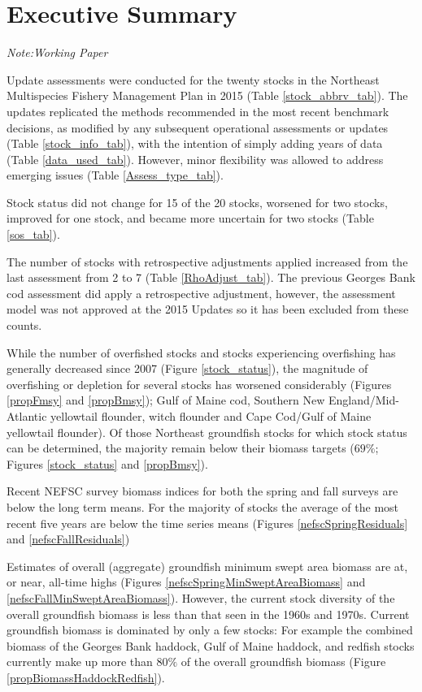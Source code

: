 
\section{Executive Summary}
\textit{Note:Working Paper}


Update assessments were conducted for the twenty stocks in the Northeast Multispecies Fishery Management Plan in 2015 (Table \ref{stock_abbrv_tab}). The updates replicated the methods recommended in the most recent benchmark decisions, as modified by any subsequent operational assessments or updates (Table \ref{stock_info_tab}), with the intention of simply adding years of data (Table \ref{data_used_tab}). However, minor flexibility was allowed to address emerging issues (Table \ref{Assess_type_tab}).

Stock status did not change for 15 of the 20 stocks, worsened for two stocks, improved for one stock, and became more uncertain for two stocks (Table \ref{sos_tab}).

The number of stocks with retrospective adjustments applied increased from the last assessment from 2 to 7 (Table \ref{RhoAdjust_tab}). The previous Georges Bank cod assessment did apply a retrospective adjustment, however, the assessment model was not approved at the 2015 Updates so it has been excluded from these counts.

While the number of overfished stocks and stocks experiencing overfishing has generally decreased since 2007 (Figure \ref{stock_status}), the magnitude of overfishing or depletion for several stocks has worsened considerably (Figures \ref{propFmsy} and \ref{propBmsy}); Gulf of Maine cod, Southern New England/Mid-Atlantic yellowtail flounder, witch flounder and Cape Cod/Gulf of Maine yellowtail flounder). Of those Northeast groundfish stocks for which stock status can be determined, the majority remain below their biomass targets ($69\%$; Figures \ref{stock_status} and \ref{propBmsy}).

Recent NEFSC survey biomass indices for both the spring and fall surveys are below the long term means. For the majority of stocks the average of the most recent five years are below the time series means (Figures \ref{nefscSpringResiduals} and \ref{nefscFallResiduals})

Estimates of overall (aggregate) groundfish minimum swept area biomass are at, or near, all-time highs (Figures \ref{nefscSpringMinSweptAreaBiomass} and \ref{nefscFallMinSweptAreaBiomass}).  However, the current stock diversity of the overall groundfish biomass is less than that seen in the 1960s and 1970s. Current groundfish biomass is dominated by only a few stocks: For example the combined biomass of the Georges Bank haddock, Gulf of Maine haddock, and redfish stocks currently make up more than $80\%$ of the overall groundfish biomass (Figure \ref{propBiomassHaddockRedfish}). 

